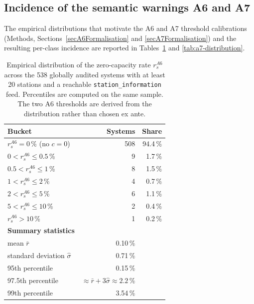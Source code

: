 \documentclass[11pt,a4paper]{article}
\begin{document}
\subsection{Incidence of the semantic warnings A6 and A7}
\label{secA6A7Incidence}
The empirical distributions that motivate the A6 and A7 threshold
calibrations (Methods, Sections~\ref{secA6Formalisation} and
\ref{secA7Formalisation}) and the resulting per-class incidence
are reported in Tables~\ref{tab:a6-distribution} and
\ref{tab:a7-distribution}.

\begin{table}[ht]
\centering
\caption{Empirical distribution of the zero-capacity rate
$r_s^{A6}$ across the 538 globally audited systems with at least
20 stations and a reachable \texttt{station\_information} feed.
Percentiles are computed on the same sample. The two A6 thresholds
are derived from the distribution rather than chosen ex ante.}
\label{tab:a6-distribution}
\small
\begin{tabular}{@{}lrr@{}}
\toprule
\textbf{Bucket} & \textbf{Systems} & \textbf{Share}\\
\midrule
$r_s^{A6} = 0$\,\% (no $c = 0$)   & 508 & 94.4\,\% \\
$0 < r_s^{A6} \leq 0.5$\,\%        &   9 &  1.7\,\% \\
$0.5 < r_s^{A6} \leq 1$\,\%        &   8 &  1.5\,\% \\
$1 < r_s^{A6} \leq 2$\,\%          &   4 &  0.7\,\% \\
$2 < r_s^{A6} \leq 5$\,\%          &   6 &  1.1\,\% \\
$5 < r_s^{A6} \leq 10$\,\%         &   2 &  0.4\,\% \\
$r_s^{A6} > 10$\,\%                &   1 &  0.2\,\% \\
\midrule
\textbf{Summary statistics} & & \\
\quad mean $\bar r$                 &  0.10\,\% & \\
\quad standard deviation $\hat\sigma$ &  0.71\,\% & \\
\quad 95th percentile               &  0.15\,\% & \\
\quad 97.5th percentile             &  $\approx \bar r + 3\hat\sigma \approx 2.2$\,\% & \\
\quad 99th percentile               &  3.54\,\% & \\
\bottomrule
\end{tabular}
\end{table}
\end{document}
